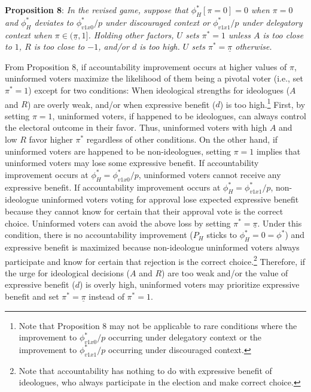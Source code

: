 \documentclass[letterpaper, 12pt]{article}
\begin{document}
    \noindent \textbf{Proposition 8}: \textit{In the revised game, suppose that $\phi^*_H[\pi=0]=0$ when $\pi=0$ and $\phi^*_H$ deviates to $\phi^*_{v1x0}/p$ under discouraged context or $\phi^*_{v1x1}/p$ under delegatory context when $\pi \in (\underline{\pi}, 1]$. Holding other factors, $U$ sets $\pi^*=1$ unless $A$ is too close to $1$, $R$ is too close to $-1$, and/or $d$ is too high. $U$ sets $\pi^*=\underline{\pi}$ otherwise.}
    
    \noindent From Proposition 8, if accountability improvement occurs at higher values of $\pi$, uninformed voters maximize the likelihood of them being a pivotal voter (i.e., set $\pi^*=1$) except for two conditions: When ideological strengths for ideologues ($A$ and $R$) are overly weak, and/or when expressive benefit ($d$) is too high.\footnote{Note that Proposition 8 may not be applicable to rare conditions where the improvement to $\phi^*_{v1x0}/p$ occurring under delegatory context or the improvement to $\phi^*_{v1x1}/p$ occurring under discouraged context.} First, by setting $\pi=1$, uninformed voters, if happened to be ideologues, can always control the electoral outcome in their favor. Thus, uninformed voters with high $A$ and low $R$ favor higher $\pi^*$ regardless of other conditions. On the other hand, if uninformed voters are happened to be non-ideologues, setting $\pi=1$ implies that uninformed voters may lose some expressive benefit. If accountability improvement occurs at  $\phi^*_H=\phi^*_{v1x0}/p$, uninformed voters cannot receive any expressive benefit. If accountability improvement occurs at  $\phi^*_H=\phi^*_{v1x1}/p$, non-ideologue uninformed voters voting for approval lose expected expressive benefit because they cannot know for certain that their approval vote is the correct choice. Uninformed voters can avoid the above loss by setting $\pi^*=\underline{\pi}$. Under this condition, there is no accountability improvement ($P_H$ sticks to $\phi^*_H=0=\phi^*$) and expressive benefit is maximized because non-ideologue uninformed voters always participate and know for certain that rejection is the correct choice.\footnote{Note that accountability has nothing to do with expressive benefit of ideologues, who always participate in the election and make correct choice.} Therefore, if the urge for ideological decisions ($A$ and $R$) are too weak and/or the value of expressive benefit ($d$) is overly high, uninformed voters may prioritize expressive benefit and set $\pi^*=\underline{\pi}$ instead of $\pi^*=1$.  
    
\end{document}
